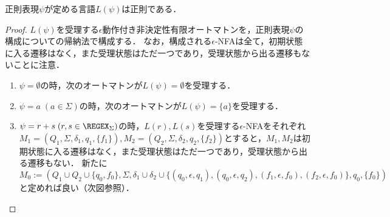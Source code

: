 \begin{theorem}
    正則表現$\psi$が定める言語$L(\psi)$は正則である．
\end{theorem}
\begin{proof}
    $L(\psi)$を受理する$\epsilon$動作付き非決定性有限オートマトンを，正則表現$\psi$の構成についての帰納法で構成する．
    なお，構成される$\epsilon$-NFAは全て，初期状態に入る遷移はなく，また受理状態はただ一つであり，受理状態から出る遷移もないことに注意．
    \begin{enumerate}
        \item $\psi=\emptyset$の時，次のオートマトンが$L(\psi)=\emptyset$を受理する．
        \begin{center}
        \end{center}
        \item $\psi=a\;(a\in\Sigma)$の時，次のオートマトンが$L(\psi)=\{a\}$を受理する．
        \begin{center}
        \end{center}
        \item $\psi=r+s\;(r,s\in\REGEX_\Sigma)$の時，$L(r),L(s)$を受理する$\epsilon$-NFAをそれぞれ$M_1=(Q_1,\Sigma,\delta_1,q_1,\{f_1\}),M_2=(Q_2,\Sigma,\delta_2,q_2,\{f_2\})$とすると，$M_1,M_2$は初期状態に入る遷移はなく，また受理状態はただ一つであり，受理状態から出る遷移もない．
        新たに$M_0:=(Q_1\cup Q_2\cup\{q_0,f_0\},\Sigma,\delta_1\cup\delta_2\cup\{(q_0,\epsilon,q_1),(q_0,\epsilon,q_2),(f_1,\epsilon,f_0),(f_2,\epsilon,f_0)\},q_0,\{f_0\})$と定めれば良い（次図参照）．
        \begin{center}
\end{center}
\end{enumerate}
\end{proof}

